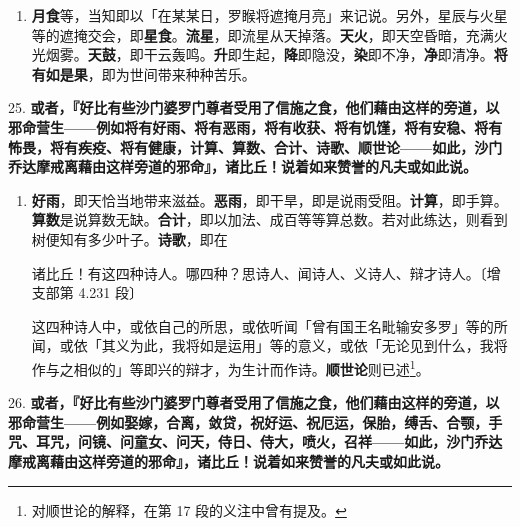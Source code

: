 \begin{enumerate}\item \textbf{月食}等，当知即以「在某某日，罗睺将遮掩月亮」来记说。另外，星辰与火星等的遮掩交会，即\textbf{星食}。\textbf{流星}，即流星从天掉落。\textbf{天火}，即天空昏暗，充满火光烟雾。\textbf{天鼓}，即干云轰鸣。\textbf{升}即生起，\textbf{降}即隐没，\textbf{染}即不净，\textbf{净}即清净。\textbf{将有如是果}，即为世间带来种种苦乐。\end{enumerate}

{\Large 25.} \textbf{或者，『好比有些沙门婆罗门尊者受用了信施之食，他们藉由这样的旁道，以邪命营生——例如将有好雨、将有恶雨，将有收获、将有饥馑，将有安稳、将有怖畏，将有疾疫、将有健康，计算、算数、合计、诗歌、顺世论——如此，沙门乔达摩戒离藉由这样旁道的邪命』，诸比丘！说着如来赞誉的凡夫或如此说。}

\begin{enumerate}\item \textbf{好雨}，即天恰当地带来滋益。\textbf{恶雨}，即干旱，即是说雨受阻。\textbf{计算}，即手算。\textbf{算数}是说算数无缺。\textbf{合计}，即以加法、成百等等算总数。若对此练达，则看到树便知有多少叶子。\textbf{诗歌}，即在\begin{quoting}诸比丘！有这四种诗人。哪四种？思诗人、闻诗人、义诗人、辩才诗人。{\bluefootnotesize 〔增支部第 4.231 段〕}\end{quoting}这四种诗人中，或依自己的所思，或依听闻「曾有国王名毗输安多罗」等的所闻，或依「其义为此，我将如是运用」等的意义，或依「无论见到什么，我将作与之相似的」等即兴的辩才，为生计而作诗。\textbf{顺世论}则已述\footnote{对顺世论的解释，在第 17 段的义注中曾有提及。}。\end{enumerate}

{\Large 26.} \textbf{或者，『好比有些沙门婆罗门尊者受用了信施之食，他们藉由这样的旁道，以邪命营生——例如娶嫁，合离，敛贷，祝好运、祝厄运，保胎，缚舌、合颚，手咒、耳咒，问镜、问童女、问天，侍日、侍大，喷火，召祥——如此，沙门乔达摩戒离藉由这样旁道的邪命』，诸比丘！说着如来赞誉的凡夫或如此说。}

